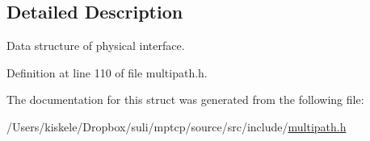 \subsection{Detailed Description}
Data structure of physical interface. 

Definition at line 110 of file multipath.\-h.



The documentation for this struct was generated from the following file\-:\begin{DoxyCompactItemize}
\item 
/\-Users/kiskele/\-Dropbox/suli/mptcp/source/src/include/\hyperlink{multipath_8h}{multipath.\-h}\end{DoxyCompactItemize}
